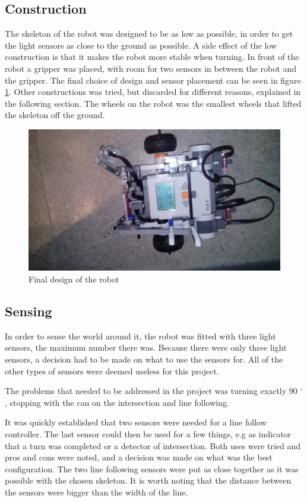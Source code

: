 \subsection{Construction}
The skeleton of the robot was designed to be as low as possible, in order to get the light sensors as close to the ground as possible. A side effect of the low construction is that it makes the robot more stable when turning. In front of the robot a gripper was placed, with room for two sensors in between the robot and the gripper. The final choice of design and sensor placement can be seen in figure \ref{fig:final_robot}. Other constructions was tried, but discarded for different reasons, explained in the following section. The wheels on the robot was the smallest wheels that lifted the skeleton off the ground.

\begin{figure}[H]
\centering
 \includegraphics[scale = 0.1]{img/robot.jpg}
 \caption{Final design of the robot}
 \label{fig:final_robot}
\end{figure}

\subsection{Sensing}
In order to sense the world around it, the robot was fitted with three light sensors, the maximum number there was. Because there were only three light sensors, a decision had to be made on what to use the sensors for. All of the other types of sensors were deemed useless for this project.

The problems that needed to be addressed in the project was turning exactly 90 $^{\circ}$, stopping with the can on the intersection and line following.

It was quickly established that two sensors were needed for a line follow controller. The last sensor could then be used for a few things, e.g as indicator that a turn was completed or a detector of intersection. Both uses were tried and pros and cons were noted, and a decision was made on what was the best configuration. The two line following sensors were put as close together as it was possible with the chosen skeleton. It is worth noting that the distance between the sensors were bigger than the width of the line.

